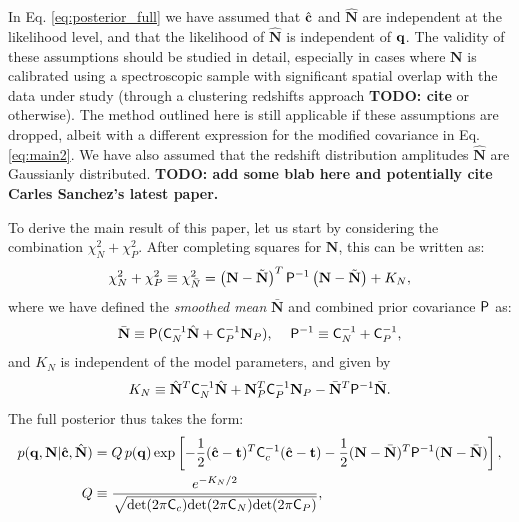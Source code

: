\documentclass[a4paper,11pt]{article}
\newcommand{\todo}[1]{{\bf TODO: #1}}
\newcommand{\vN}{\mathbf{N}}
\begin{document}
      In Eq. \ref{eq:posterior_full} we have assumed that $\hat{\bf c}$ and $\hat{\vN}$ are independent at the likelihood level, and that the likelihood of $\hat{\vN}$ is independent of ${\bf q}$. The validity of these assumptions should be studied in detail, especially in cases where $\vN$ is calibrated using a spectroscopic sample with significant spatial overlap with the data under study (through a clustering redshifts approach \todo{cite} or otherwise). The method outlined here is still applicable if these assumptions are dropped, albeit with a different expression for the modified covariance in Eq. \ref{eq:main2}. We have also assumed that the redshift distribution amplitudes $\hat{\vN}$ are Gaussianly distributed. \todo{add some blab here and potentially cite Carles Sanchez's latest paper.}

      To derive the main result of this paper, let us start by considering the combination $\chi^2_N+\chi^2_P$. After completing squares for $\vN$, this can be written as:
      \begin{equation}
        \chi^2_N+\chi^2_P\equiv\chi^2_{\bar{N}}=\left(\vN-\tilde{\vN}\right)^T{\sf P}^{-1}\left(\vN-\tilde{\vN}\right)+K_N,
      \end{equation}
      where we have defined the \emph{smoothed mean} $\bar{\vN}$ and combined prior covariance ${\sf P}$ as:
      \begin{align}\label{eq:priorcov}
        \bar{\vN}\equiv{\sf P}({\sf C}_N^{-1}\hat{\bf N}+{\sf C}_P^{-1}\vN_P),\hspace{12pt} {\sf P}^{-1}\equiv{\sf C}_N^{-1}+{\sf C}_P^{-1},
      \end{align}
      and $K_N$ is independent of the model parameters, and given by
      \begin{equation}
        K_N\equiv\hat{\bf N}^T{\sf C}^{-1}_N\hat{\bf N}+\vN_P^T{\sf C}_P^{-1}\vN_P-\bar{\vN}^T{\sf P}^{-1}\bar{\vN}.
      \end{equation}
      The full posterior thus takes the form:
      \begin{align}
        p({\bf q},\vN|\hat{\bf c},\hat{\bf N})&=Q\,p({\bf q})\exp\left[-\frac{1}{2}(\hat{\bf c}-{\bf t})^T{\sf C}^{-1}_c(\hat{\bf c}-{\bf t})-\frac{1}{2}(\vN-\bar{\vN})^T{\sf P}^{-1}(\vN-\bar{\vN})\right],\\
        Q&\equiv\frac{e^{-K_N/2}}{\sqrt{{\rm det}(2\pi{\sf C}_c){\rm det}(2\pi{\sf C}_N){\rm det}(2\pi{\sf C}_P)}},
      \end{align}

\end{document}
